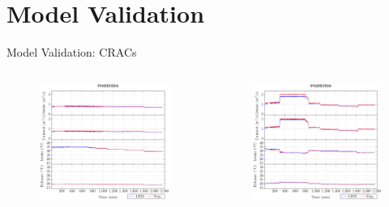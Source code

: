 \documentclass{beamer}
\begin{document}
\section{Model Validation}
\begin{frame}{Model Validation: CRACs}
\vspace{-1cm}
\begin{columns}[T] %
\begin{column}{.6\textwidth}
	\begin{figure}[!htb]
	\includegraphics[width=\linewidth]{Plots/P02HDZ04_T.pdf}
	\end{figure}
\end{column}%
\hfill%
\begin{column}{.6\textwidth}
	\begin{figure}[!htb]
	\includegraphics[width=\linewidth]{Plots/P02HDZ02_T.pdf}

\end{figure}
\end{column}
\end{columns}
\end{frame}
\end{document}
